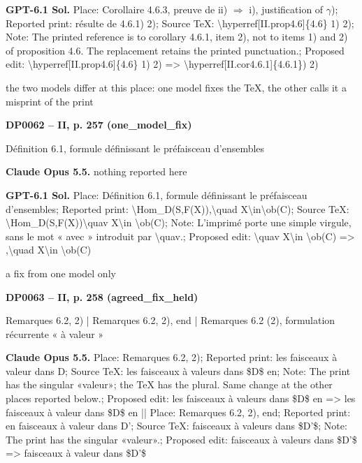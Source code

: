 \textbf{GPT-6.1 Sol.} Place: Corollaire 4.6.3, preuve de ii) \ensuremath{\Rightarrow} i), justification of \ensuremath{\gamma}); Reported print: résulte de 4.6.1) 2); Source TeX: \textbackslash{}hyperref[II.prop4.6]\{4.6\} 1) 2); Note: The printed reference is to corollary 4.6.1, item 2), not to items 1) and 2) of proposition 4.6. The replacement retains the printed punctuation.; Proposed edit: \textbackslash{}hyperref[II.prop4.6]\{4.6\} 1) 2) =\allowbreak > \textbackslash{}hyperref[II.cor4.6.1]\{4.6.1\}) 2)\par
the two models differ at this place: one model fixes the TeX, the other calls it a misprint of the print\par
\par\noindent\hypertarget{DP0062}{}\textbf{DP0062 -- II, p. 257 (one\_model\_fix)}\par
Définition 6.1, formule définissant le préfaisceau d'ensembles\par
\textbf{Claude Opus 5.5.} nothing reported here\par
\textbf{GPT-6.1 Sol.} Place: Définition 6.1, formule définissant le préfaisceau d'ensembles; Reported print: \textbackslash{}Hom\_D(S,F(X)),\textbackslash{}quad X\textbackslash{}in\textbackslash{}ob(C); Source TeX: \textbackslash{}Hom\_D(S,F(X))\textbackslash{}quav X\textbackslash{}in \textbackslash{}ob(C); Note: L'imprimé porte une simple virgule, sans le mot « avec » introduit par \textbackslash{}quav.; Proposed edit: \textbackslash{}quav X\textbackslash{}in \textbackslash{}ob(C) =\allowbreak > ,\textbackslash{}quad X\textbackslash{}in \textbackslash{}ob(C)\par
a fix from one model only\par
\par\noindent\hypertarget{DP0063}{}\textbf{DP0063 -- II, p. 258 (agreed\_fix\_held)}\par
Remarques 6.2, 2) | Remarques 6.2, 2), end | Remarques 6.2 (2), formulation récurrente « à valeur »\par
\textbf{Claude Opus 5.5.} Place: Remarques 6.2, 2); Reported print: les faisceaux à valeur dans D; Source TeX: les faisceaux à valeurs dans \$D\$ en; Note: The print has the singular «valeur»; the TeX has the plural. Same change at the other places reported below.; Proposed edit: les faisceaux à valeurs dans \$D\$ en =\allowbreak > les faisceaux à valeur dans \$D\$ en || Place: Remarques 6.2, 2), end; Reported print: en faisceaux à valeur dans D'; Source TeX: faisceaux à valeurs dans \$D'\$; Note: The print has the singular «valeur».; Proposed edit: faisceaux à valeurs dans \$D'\$ =\allowbreak > faisceaux à valeur dans \$D'\$\par

